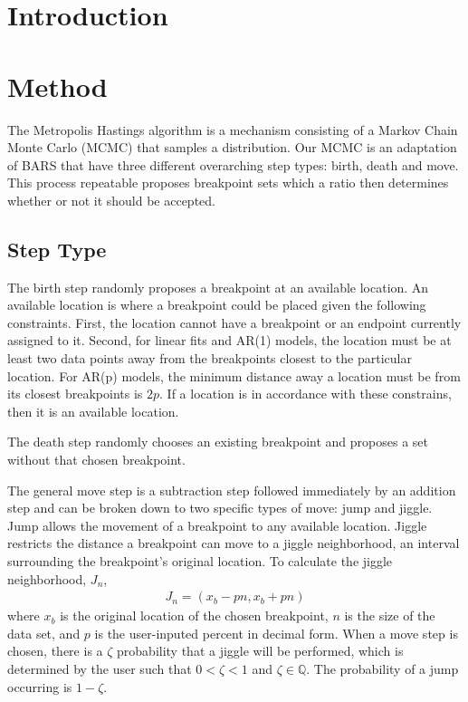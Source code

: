 \documentclass[submit]{smj}
\begin{document}
\maketitle


\section{Introduction}

\section{Method}
The Metropolis Hastings algorithm is a mechanism consisting of a Markov Chain Monte Carlo (MCMC) that samples a distribution.  Our MCMC is an adaptation of BARS that have three different overarching step types: birth, death and move. This process repeatable proposes breakpoint sets which a ratio then determines whether or not it should be accepted. 

\subsection{Step Type}

The birth step randomly proposes a breakpoint at an available location. An available location is where a breakpoint could be placed given the following constraints. First, the location cannot have a breakpoint or an endpoint currently assigned to it. Second, for linear fits and AR(1) models, the location must be at least two data points away from the breakpoints closest to the particular location. For AR(p) models, the minimum distance away a location must be from its closest breakpoints is $2p$. If a location is in accordance with these constrains, then it is an available location.  

The death step randomly chooses an existing breakpoint and proposes a set without that chosen breakpoint. 

The general move step is a subtraction step followed immediately by an addition step and can be broken down to two specific types of move: jump and jiggle. Jump allows the movement of a breakpoint to any available location. Jiggle restricts the distance a breakpoint can move to a jiggle neighborhood, an interval surrounding the breakpoint's original location. To calculate the jiggle neighborhood, $J_n$, 
\begin{align*}
J_n = ( x_b-pn, x_b+pn )
\end{align*}
where $x_b$ is the original location of the chosen breakpoint, $n$ is the size of the data set, and $p$ is the user-inputed percent in decimal form. When a move step is chosen, there is a $\zeta$ probability that a jiggle will be performed, which is determined by the user such that $0<\zeta<1$ and $\zeta \in \mathbb{Q}$. The probability of a jump occurring is $1-\zeta$. 
\end{document}
